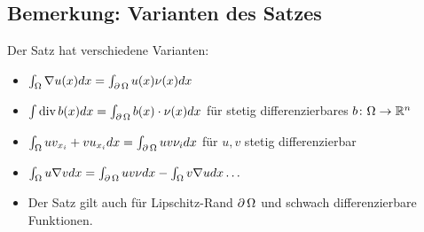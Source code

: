 \subsection{Bemerkung: Varianten des Satzes}
\label{bem_14}
	Der Satz hat verschiedene Varianten: \marginnote{[14]}
	\begin{itemize}
		\item $\int_\Omega \nabla u(x) dx = \int_{\operatorname{\partial} \Omega} u(x) \nu(x) dx$
		\item $\int \operatorname{div} b(x) dx = \int_{\operatorname{\partial} \Omega} b(x) \cdot \nu(x) dx$ für stetig differenzierbares $b\colon \Omega \rightarrow \mathbb{R}^n$
		\item $\int_\Omega uv_{x_i} + vu_{x_i} dx = \int_{\operatorname{\partial} \Omega} uv \nu_i dx$ für $u,v$ stetig differenzierbar
		\item $\int_\Omega u \nabla v dx = \int_{\operatorname{\partial} \Omega} u v \nu dx - \int_\Omega v \nabla u dx \dots$
		\item Der Satz gilt auch für Lipschitz-Rand $\operatorname{\partial} \Omega$ und schwach differenzierbare Funktionen.
	\end{itemize}
\newpage